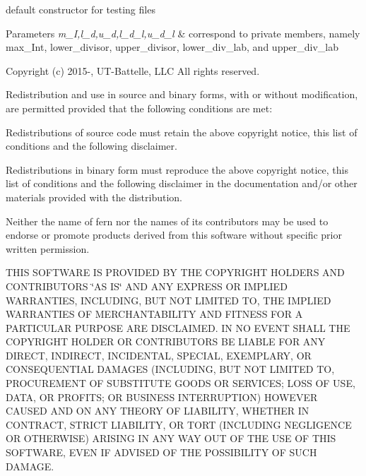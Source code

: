 default constructor for testing files 
\begin{DoxyParams}{Parameters}
{\em m\+\_\+I,l\+\_\+d,u\+\_\+d,l\+\_\+d\+\_\+l,u\+\_\+d\+\_\+l} & correspond to private members, namely max\+\_\+\+Int, lower\+\_\+divisor, upper\+\_\+divisor, lower\+\_\+div\+\_\+lab, and upper\+\_\+div\+\_\+lab\\
\hline
\end{DoxyParams}


 Copyright (c) 2015-\/, U\+T-\/\+Battelle, L\+LC All rights reserved.

Redistribution and use in source and binary forms, with or without modification, are permitted provided that the following conditions are met\+:

Redistributions of source code must retain the above copyright notice, this list of conditions and the following disclaimer.

Redistributions in binary form must reproduce the above copyright notice, this list of conditions and the following disclaimer in the documentation and/or other materials provided with the distribution.

Neither the name of fern nor the names of its contributors may be used to endorse or promote products derived from this software without specific prior written permission.

T\+H\+IS S\+O\+F\+T\+W\+A\+RE IS P\+R\+O\+V\+I\+D\+ED BY T\+HE C\+O\+P\+Y\+R\+I\+G\+HT H\+O\+L\+D\+E\+RS A\+ND C\+O\+N\+T\+R\+I\+B\+U\+T\+O\+RS \char`\"{}\+A\+S I\+S\char`\"{} A\+ND A\+NY E\+X\+P\+R\+E\+SS OR I\+M\+P\+L\+I\+ED W\+A\+R\+R\+A\+N\+T\+I\+ES, I\+N\+C\+L\+U\+D\+I\+NG, B\+UT N\+OT L\+I\+M\+I\+T\+ED TO, T\+HE I\+M\+P\+L\+I\+ED W\+A\+R\+R\+A\+N\+T\+I\+ES OF M\+E\+R\+C\+H\+A\+N\+T\+A\+B\+I\+L\+I\+TY A\+ND F\+I\+T\+N\+E\+SS F\+OR A P\+A\+R\+T\+I\+C\+U\+L\+AR P\+U\+R\+P\+O\+SE A\+RE D\+I\+S\+C\+L\+A\+I\+M\+ED. IN NO E\+V\+E\+NT S\+H\+A\+LL T\+HE C\+O\+P\+Y\+R\+I\+G\+HT H\+O\+L\+D\+ER OR C\+O\+N\+T\+R\+I\+B\+U\+T\+O\+RS BE L\+I\+A\+B\+LE F\+OR A\+NY D\+I\+R\+E\+CT, I\+N\+D\+I\+R\+E\+CT, I\+N\+C\+I\+D\+E\+N\+T\+AL, S\+P\+E\+C\+I\+AL, E\+X\+E\+M\+P\+L\+A\+RY, OR C\+O\+N\+S\+E\+Q\+U\+E\+N\+T\+I\+AL D\+A\+M\+A\+G\+ES (I\+N\+C\+L\+U\+D\+I\+NG, B\+UT N\+OT L\+I\+M\+I\+T\+ED TO, P\+R\+O\+C\+U\+R\+E\+M\+E\+NT OF S\+U\+B\+S\+T\+I\+T\+U\+TE G\+O\+O\+DS OR S\+E\+R\+V\+I\+C\+ES; L\+O\+SS OF U\+SE, D\+A\+TA, OR P\+R\+O\+F\+I\+TS; OR B\+U\+S\+I\+N\+E\+SS I\+N\+T\+E\+R\+R\+U\+P\+T\+I\+ON) H\+O\+W\+E\+V\+ER C\+A\+U\+S\+ED A\+ND ON A\+NY T\+H\+E\+O\+RY OF L\+I\+A\+B\+I\+L\+I\+TY, W\+H\+E\+T\+H\+ER IN C\+O\+N\+T\+R\+A\+CT, S\+T\+R\+I\+CT L\+I\+A\+B\+I\+L\+I\+TY, OR T\+O\+RT (I\+N\+C\+L\+U\+D\+I\+NG N\+E\+G\+L\+I\+G\+E\+N\+CE OR O\+T\+H\+E\+R\+W\+I\+SE) A\+R\+I\+S\+I\+NG IN A\+NY W\+AY O\+UT OF T\+HE U\+SE OF T\+H\+IS S\+O\+F\+T\+W\+A\+RE, E\+V\+EN IF A\+D\+V\+I\+S\+ED OF T\+HE P\+O\+S\+S\+I\+B\+I\+L\+I\+TY OF S\+U\+CH D\+A\+M\+A\+GE.

